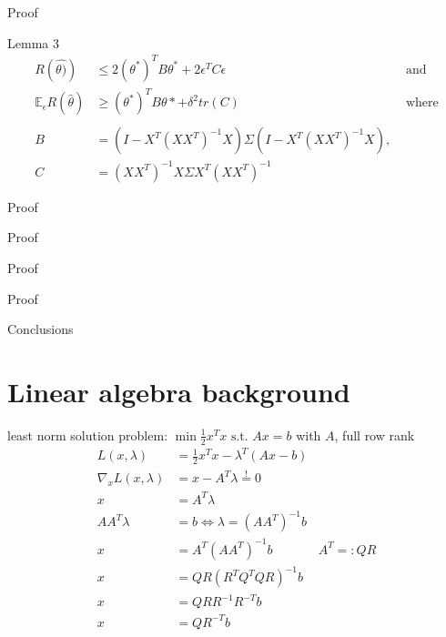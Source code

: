 \documentclass{beamer}
\begin{document}
\begin{frame}{Proof}
\begin{center}
\begin{block}{Lemma 3}
	\begin{align*}
	R(\hat{\theta)}) & \leq 2(\theta^*)^TB\theta^* + 2\epsilon^TC\epsilon & \text{ and} \\
	\mathbb{E}_\epsilon R(\hat{\theta}) & \geq (\theta^*)^TB\theta* + \delta^2tr(C) & \text{ where}\\\\
	B & = (I - X^T(XX^T)^{-1}X)\Sigma(I - X^T(XX^T)^{-1}X),  \\
	C & = (XX^T)^{-1}X\Sigma X^T(XX^T)^{-1}
	\end{align*}
\end{block}
\end{center}
\end{frame}

\begin{frame}{Proof}
\end{frame}

\begin{frame}{Proof}
\end{frame}

\begin{frame}{Proof}
\end{frame}

\begin{frame}{Proof}
\end{frame}


\begin{frame}{Conclusions}
\begin{center}
		
\end{center}
\end{frame}



\section{Linear algebra background}

\begin{frame} {least norm solution}
problem: \(\min \frac{1}{2} x^Tx \text{ s.t. } Ax = b\) with \(A\), full row rank
\pause
\begin{align*}
	L(x,\lambda) &= \frac{1}{2} x^Tx - \lambda^T (Ax -b)\\
	\nabla_x L(x,\lambda) &= x - A^T \lambda \stackrel{!}{=} 0\\
	x & = A^T \lambda\\
	AA^T \lambda &= b \Leftrightarrow \lambda = (AA^T)^{-1} b\\
	x &= A^T(AA^T)^{-1} b & A^T =: QR\\
	x &= QR(R^TQ^TQR)^{-1}b\\
	x &= QRR^{-1} R^{-T}b\\
	x &= QR^{-T}b
\end{align*}
\end{frame}
\end{document}
